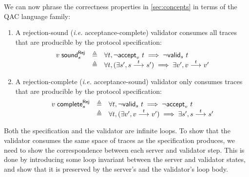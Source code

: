 We can now phrase the correctness properties in \autoref{sec:concepts} in terms
of the QAC language family:
\begin{enumerate}
  \item A rejection-sound ({\it i.e.} acceptance-complete) validator consumes
    all traces that are producible by the protocol specification:
    \[\begin{array}{lrl}
      v\;\mathsf{sound}_{s}^\mathsf{Rej}&\triangleq&\forall t,\neg\mathsf{accept}_{v}~{t}\implies\neg\mathsf{valid}_{s}~{t}\\
      &\triangleq&\forall t,(\exists s',s\overset{t}\longrightarrow_{} s')\implies\exists v',v\overset{t}\longrightarrow_{} v'
    \end{array}\]
  \item A rejection-complete ({\it i.e.} acceptance-sound) validator only
    consumes traces that are producible by the protocol specification:
    \[\begin{array}{lrl}
      v\;\mathsf{complete}_{s}^\mathsf{Rej}&\triangleq&\forall t,\neg\mathsf{valid}_{s}~{t}\implies\neg\mathsf{accept}_{v}~{t}\\
      &\triangleq&\forall t,(\exists v',v\overset{t}\longrightarrow_{} v')\implies\exists s',s\overset{t}\longrightarrow_{} s'
    \end{array}\]
\end{enumerate}

Both the specification and the validator are infinite loops.  To show that the
validator consumes the same space of traces as the specification produces, we
need to show the correspondence between each server and validator step.  This is
done by introducing some loop invariant between the server and validator states,
and show that it is preserved by the server's and the validator's loop body.

